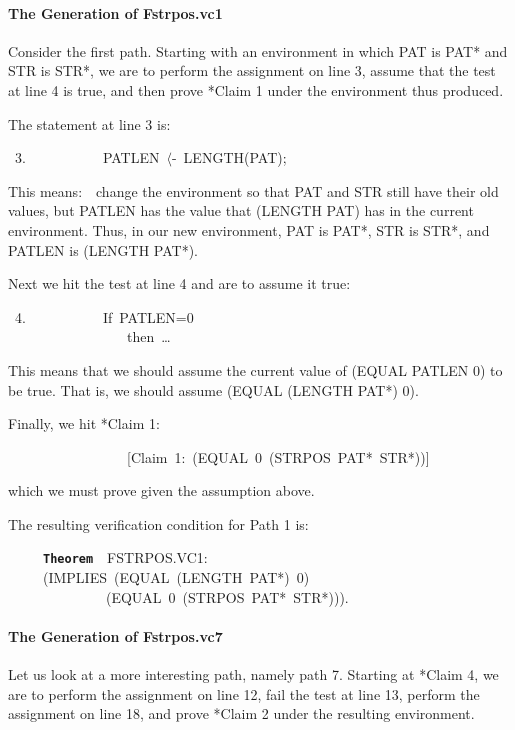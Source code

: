 \documentclass[11pt]{book}
\newenvironment{pubasis}{\begin{flushleft}\ttfamily\small}{\normalsize\rmfamily\end{flushleft}}
\newcommand{\axiomordefinition}[1]{\vspace{6pt}\texttt{\textbf{#1}}}
\newcommand{\pubdefaulttextsize}{\large}
\begin{document}
\paragraph{The Generation of Fstrpos.vc1}
\pubdefaulttextsize
Consider the first path.  Starting with an environment in which PAT is PAT*
and STR is STR*, we are to perform the assignment on line 3, assume that the test
at line 4 is true, and then prove *Claim 1 under the environment thus produced.

The statement at line 3 is:
\begin{pubasis}
~3.~~~~~~~~~~~PATLEN~$\langle$-~LENGTH(PAT);\\
\end{pubasis}
This means:~~change the environment so that PAT and STR
still have their old values, but PATLEN has the value that (LENGTH PAT)
has in the current environment.  Thus, in our new environment, PAT is PAT*,
STR is STR*, and PATLEN is (LENGTH PAT*).

Next we hit the test at line 4 and are to assume it true:
\begin{pubasis}
~4.~~~~~~~~~~~If~PATLEN=0\\
~~~~~~~~~~~~~~~~~then~\ldots{}\\
\end{pubasis}
This means that we should assume the current value of
(EQUAL PATLEN 0) to be true.  That is, we should assume (EQUAL (LENGTH PAT*) 0).

Finally, we hit *Claim 1:
\begin{pubasis}
~~~~~~~~~~~~~~~~~{[}Claim~1:~(EQUAL~0~(STRPOS~PAT*~STR*)){]}\\
\end{pubasis}
which we must prove given the assumption above.

The resulting verification condition for Path 1 is:
\begin{pubasis}
~~~~~\axiomordefinition{Theorem}~~FSTRPOS.VC1:\\
~~~~~(IMPLIES~(EQUAL~(LENGTH~PAT*)~0)\\
~~~~~~~~~~~~~~(EQUAL~0~(STRPOS~PAT*~STR*))).\\
\end{pubasis}
\paragraph{The Generation of Fstrpos.vc7}
\pubdefaulttextsize
Let us look at a more interesting path, namely  path 7.  Starting at *Claim 4, we are to perform
the assignment on line 12, fail the test at line 13,
perform the assignment on line 18, and prove *Claim 2 under the resulting
environment.
\end{document}
